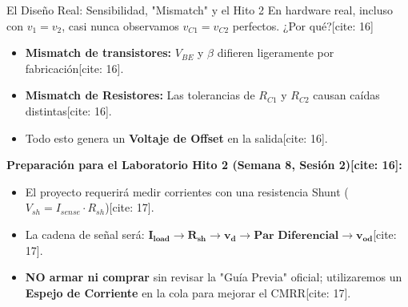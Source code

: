 \documentclass[aspectratio=169]{beamer}
\begin{document}
\begin{frame}{El Diseño Real: Sensibilidad, "Mismatch" y el Hito 2}
    En hardware real, incluso con $v_1 = v_2$, casi nunca observamos $v_{C1} = v_{C2}$ perfectos. ¿Por qué?[cite: 16]
    \begin{itemize}
        \item \textbf{Mismatch de transistores:} $V_{BE}$ y $\beta$ difieren ligeramente por fabricación[cite: 16].
        \item \textbf{Mismatch de Resistores:} Las tolerancias de $R_{C1}$ y $R_{C2}$ causan caídas distintas[cite: 16].
        \item Todo esto genera un \textbf{Voltaje de Offset} en la salida[cite: 16].
    \end{itemize}
    
    \textbf{Preparación para el Laboratorio Hito 2 (Semana 8, Sesión 2)[cite: 16]:}
    \begin{itemize}
        \item El proyecto requerirá medir corrientes con una resistencia Shunt ($V_{sh} = I_{sense} \cdot R_{sh}$)[cite: 17].
        \item La cadena de señal será: $\mathbf{I_{load} \to R_{sh} \to v_d \to \text{Par Diferencial} \to v_{od}}$[cite: 17].
        \item \textbf{NO armar ni comprar} sin revisar la "Guía Previa" oficial; utilizaremos un \textbf{Espejo de Corriente} en la cola para mejorar el CMRR[cite: 17].
    \end{itemize}
\end{frame}
\end{document}
